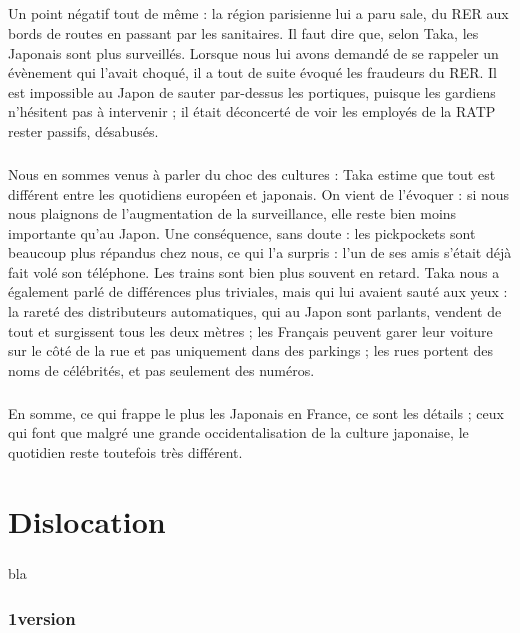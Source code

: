 \paragraph{}
Un point négatif tout de même : la région parisienne lui a paru sale, du RER aux bords de routes en passant par les sanitaires. Il faut dire que, selon Taka, les Japonais sont plus surveillés. Lorsque nous lui avons demandé de se rappeler un évènement qui l’avait choqué, il a tout de suite évoqué les fraudeurs du RER. Il est impossible au Japon de sauter par-dessus les portiques, puisque les gardiens n’hésitent pas à intervenir ; il était déconcerté de voir les employés de la RATP rester passifs, désabusés.
\paragraph{}
Nous en sommes venus à parler du choc des cultures : Taka estime que tout est différent entre les quotidiens européen et japonais. On vient de l’évoquer : si nous nous plaignons de l’augmentation de la surveillance, elle reste bien moins importante qu’au Japon. Une conséquence, sans doute : les pickpockets sont beaucoup plus répandus chez nous, ce qui l’a surpris : l’un de ses amis s’était déjà fait volé son téléphone. Les trains sont bien plus souvent en retard. Taka nous a également parlé de différences plus triviales, mais qui lui avaient sauté aux yeux : la rareté des distributeurs automatiques, qui au Japon sont parlants, vendent de tout et surgissent tous les deux mètres ; les Français peuvent garer leur voiture sur le côté de la rue et pas uniquement dans des parkings ; les rues portent des noms de célébrités, et pas seulement des numéros.
\paragraph{}
En somme, ce qui frappe le plus les Japonais en France, ce sont les détails ; ceux qui font que malgré une grande occidentalisation de la culture japonaise, le quotidien reste toutefois très différent.



\chapter{Dislocation}
\paragraph{}
bla

\subsection{1\ier version}
